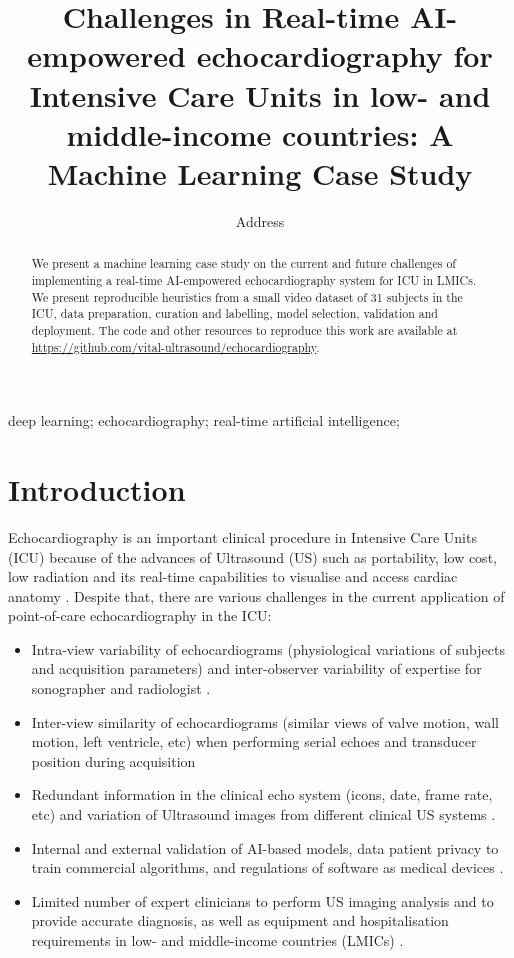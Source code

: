 \documentclass[mlabstract,twocolumn]{jmlr}
\title[Short Title]{
Challenges in Real-time AI-empowered echocardiography for Intensive Care Units in low- and middle-income countries: A Machine Learning Case Study %
}
\author{
     \Name{Anonymous Author(s)} \Email{email@sample.com}
      \addr Address
   }
\begin{document}
\maketitle

\begin{abstract}
We present a machine learning case study on the current and future challenges of implementing a real-time AI-empowered echocardiography system for ICU in LMICs.
We present reproducible heuristics from a small video dataset of 31 subjects in the ICU, data preparation, curation and labelling, model selection, validation and deployment.
The code and other resources to reproduce this work are available at \url{https://github.com/vital-ultrasound/echocardiography}.
\end{abstract}
\begin{keywords}
deep learning; echocardiography; real-time artificial intelligence;
\end{keywords}

\section{Introduction}
\label{sec:intro}
Echocardiography is an important clinical procedure in Intensive Care Units (ICU) because of the advances of Ultrasound (US) such as portability, low cost, low radiation and its real-time capabilities to visualise and access cardiac anatomy \citep{Feigenbaum1996, Vieillard-Baron2008, singh2007, cambell2018}.
Despite that, there are various challenges in the current application of point-of-care echocardiography in the ICU:
\begin{itemize}
\setlength\itemsep{0em}
\item Intra-view variability of echocardiograms (physiological variations of subjects and acquisition parameters) and inter-observer variability of expertise for sonographer and radiologist \citep{khamis2017, Feigenbaum1996, field2011}.
\item Inter-view similarity of echocardiograms (similar views of valve motion, wall motion, left ventricle, etc) when performing serial echoes and transducer position during acquisition \citep{zhang2018}
\item Redundant information in the clinical echo system (icons, date, frame rate, etc) \citep{khamis2017} and variation of Ultrasound images from different clinical US systems \citep{brindise2020unsupervised}.
\item Internal and external validation of AI-based models, data patient privacy to train commercial algorithms, and regulations of software as medical devices \citep{2022_Stewart_Emergency_Medicine_Australasia}.
\item Limited number of expert clinicians to perform US imaging analysis and to provide accurate diagnosis, as well as equipment and hospitalisation requirements in low- and middle-income countries (LMICs) \citep{hao2021-wellcome, 2021-huyNhat-vanHao-in-FAIR-MICCAI}.
\end{itemize}
\end{document}
